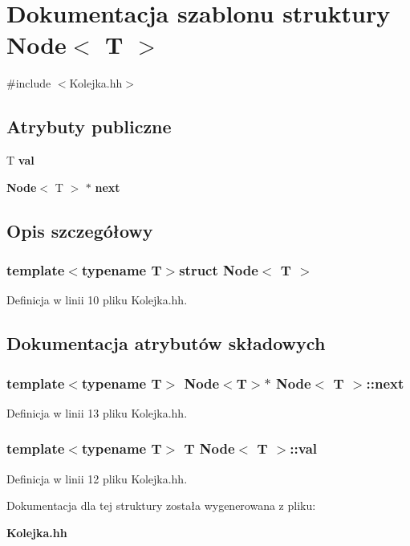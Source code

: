 \section{Dokumentacja szablonu struktury Node$<$ T $>$}
\label{struct_node}


{\ttfamily \#include $<$Kolejka.\-hh$>$}

\subsection*{Atrybuty publiczne}
\begin{DoxyCompactItemize}
\item 
T {\bf val}
\item 
{\bf Node}$<$ T $>$ $\ast$ {\bf next}
\end{DoxyCompactItemize}


\subsection{Opis szczegółowy}
\subsubsection*{template$<$typename T$>$struct Node$<$ T $>$}



Definicja w linii 10 pliku Kolejka.\-hh.



\subsection{Dokumentacja atrybutów składowych}
\subsubsection[{next}]{\setlength{\rightskip}{0pt plus 5cm}template$<$typename T$>$ {\bf Node}$<$T$>$$\ast$ {\bf Node}$<$ T $>$\-::next}\label{struct_node_a8bedac90cd0aedd2847dd49f671d4d4a}


Definicja w linii 13 pliku Kolejka.\-hh.

\subsubsection[{val}]{\setlength{\rightskip}{0pt plus 5cm}template$<$typename T$>$ T {\bf Node}$<$ T $>$\-::val}\label{struct_node_a63ca7703bf78a4ea3f6a7f32a9f705c8}


Definicja w linii 12 pliku Kolejka.\-hh.



Dokumentacja dla tej struktury została wygenerowana z pliku\-:\begin{DoxyCompactItemize}
\item 
{\bf Kolejka.\-hh}\end{DoxyCompactItemize}
